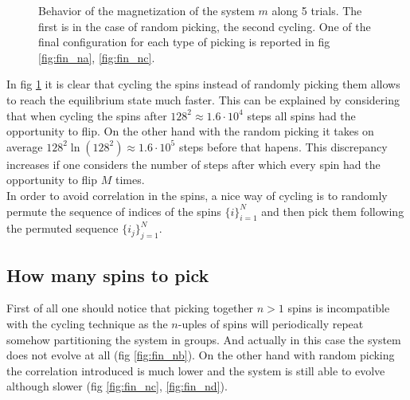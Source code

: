 \documentclass[a4paper, 11pt]{article}
\begin{document}
      \begin{figure}[H]
        \centering
         \quad
        \caption{Behavior of the magnetization of the system $m$ along 5 trials. The first is in the case of random picking, the second cycling. One of the final configuration for each type of picking is reported in fig \ref{fig:fin_na}, \ref{fig:fin_nc}.}
        \label{fig:pick_m}
      \end{figure}

      In fig \ref{fig:pick_m} it is clear that cycling the spins instead of randomly picking them allows to reach the equilibrium state much faster. This can be explained by considering that when cycling the spins after $128^2 \approx 1.6\cdot10^4$ steps all spins had the opportunity to flip. On the other hand with the random picking it takes on average $128^2 \ln (128^2) \approx 1.6\cdot10^5$ steps before that hapens. This discrepancy increases if one considers the number of steps after which every spin had the opportunity to flip $M$ times.\\
      In order to avoid correlation in the spins, a nice way of cycling is to randomly permute the sequence of indices of the spins $\{i\}_{i=1}^N$ and then pick them following the permuted sequence $\{i_j\}_{j=1}^N$.

    \subsection{How many spins to pick}
      First of all one should notice that picking together $n > 1$ spins is incompatible with the cycling technique as the $n$-uples of spins will periodically repeat somehow partitioning the system in groups. And actually in this case the system does not evolve at all (fig \ref{fig:fin_nb}).
      On the other hand with random picking the correlation introduced is much lower and the system is still able to evolve although slower (fig \ref{fig:fin_nc}, \ref{fig:fin_nd}).
\end{document}
